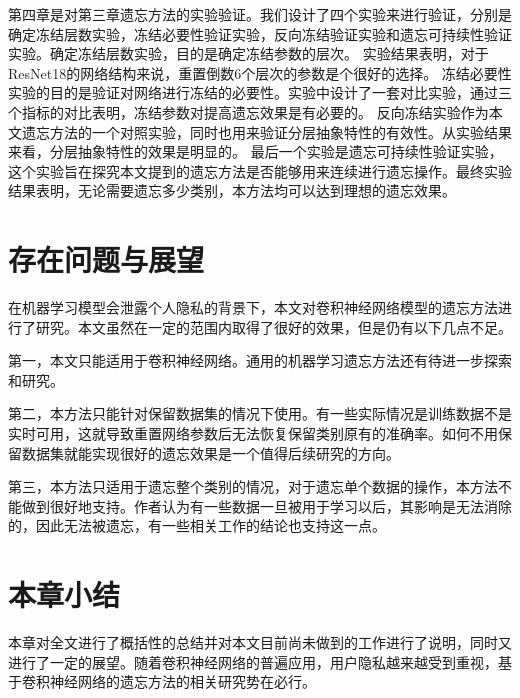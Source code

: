 第四章是对第三章遗忘方法的实验验证。我们设计了四个实验来进行验证，分别是确定冻结层数实验，冻结必要性验证实验，反向冻结验证实验和遗忘可持续性验证实验。确定冻结层数实验，目的是确定冻结参数的层次。
实验结果表明，对于ResNet18的网络结构来说，重置倒数6个层次的参数是个很好的选择。
冻结必要性实验的目的是验证对网络进行冻结的必要性。实验中设计了一套对比实验，通过三个指标的对比表明，冻结参数对提高遗忘效果是有必要的。
反向冻结实验作为本文遗忘方法的一个对照实验，同时也用来验证分层抽象特性的有效性。从实验结果来看，分层抽象特性的效果是明显的。
最后一个实验是遗忘可持续性验证实验，这个实验旨在探究本文提到的遗忘方法是否能够用来连续进行遗忘操作。最终实验结果表明，无论需要遗忘多少类别，本方法均可以达到理想的遗忘效果。

\section{存在问题与展望}
在机器学习模型会泄露个人隐私的背景下，本文对卷积神经网络模型的遗忘方法进行了研究。本文虽然在一定的范围内取得了很好的效果，但是仍有以下几点不足。

第一，本文只能适用于卷积神经网络。通用的机器学习遗忘方法还有待进一步探索和研究。

第二，本方法只能针对保留数据集的情况下使用。有一些实际情况是训练数据不是实时可用，这就导致重置网络参数后无法恢复保留类别原有的准确率。如何不用保留数据集就能实现很好的遗忘效果是一个值得后续研究的方向。

第三，本方法只适用于遗忘整个类别的情况，对于遗忘单个数据的操作，本方法不能做到很好地支持。作者认为有一些数据一旦被用于学习以后，其影响是无法消除的，因此无法被遗忘，有一些相关工作\cite{2018arXiv181205159T}的结论也支持这一点。

\section{本章小结}
本章对全文进行了概括性的总结并对本文目前尚未做到的工作进行了说明，同时又进行了一定的展望。随着卷积神经网络的普遍应用，用户隐私越来越受到重视，基于卷积神经网络的遗忘方法的相关研究势在必行。
